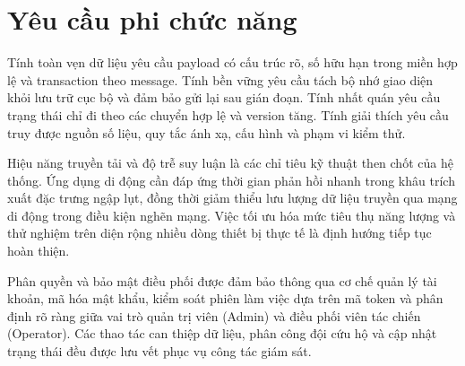 \section{Yêu cầu phi chức năng}\label{sec:nonfunctional-requirements}
Tính toàn vẹn dữ liệu yêu cầu payload có cấu trúc rõ, số hữu hạn trong miền hợp lệ và transaction theo message. Tính bền vững yêu cầu tách bộ nhớ giao diện khỏi lưu trữ cục bộ và đảm bảo gửi lại sau gián đoạn. Tính nhất quán yêu cầu trạng thái chỉ đi theo các chuyển hợp lệ và version tăng. Tính giải thích yêu cầu truy được nguồn số liệu, quy tắc ánh xạ, cấu hình và phạm vi kiểm thử.

Hiệu năng truyền tải và độ trễ suy luận là các chỉ tiêu kỹ thuật then chốt của hệ thống. Ứng dụng di động cần đáp ứng thời gian phản hồi nhanh trong khâu trích xuất đặc trưng ngập lụt, đồng thời giảm thiểu lưu lượng dữ liệu truyền qua mạng di động trong điều kiện nghẽn mạng. Việc tối ưu hóa mức tiêu thụ năng lượng và thử nghiệm trên diện rộng nhiều dòng thiết bị thực tế là định hướng tiếp tục hoàn thiện.

Phân quyền và bảo mật điều phối được đảm bảo thông qua cơ chế quản lý tài khoản, mã hóa mật khẩu, kiểm soát phiên làm việc dựa trên mã token và phân định rõ ràng giữa vai trò quản trị viên (Admin) và điều phối viên tác chiến (Operator). Các thao tác can thiệp dữ liệu, phân công đội cứu hộ và cập nhật trạng thái đều được lưu vết phục vụ công tác giám sát.
